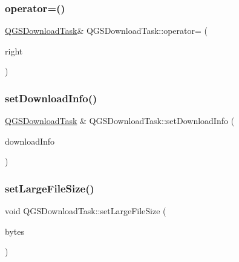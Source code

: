 \mbox{\label{class_q_g_s_download_task_a97a226091a8759b848b3fc7754a52f38}} 
\subsubsection{\texorpdfstring{operator=()}{operator=()}\hspace{0.1cm}{\footnotesize\ttfamily [2/2]}}
{\footnotesize\ttfamily \mbox{\hyperlink{class_q_g_s_download_task}{Q\+G\+S\+Download\+Task}}\& Q\+G\+S\+Download\+Task\+::operator= (\begin{DoxyParamCaption}\item[{\mbox{\hyperlink{class_q_g_s_download_task}{Q\+G\+S\+Download\+Task}} \&\&}]{right }\end{DoxyParamCaption})\hspace{0.3cm}{\ttfamily [delete]}}

\mbox{\label{class_q_g_s_download_task_a0d53b40daf5e4074629d9ce552f4f579}} 
\subsubsection{\texorpdfstring{set\+Download\+Info()}{setDownloadInfo()}}
{\footnotesize\ttfamily \mbox{\hyperlink{class_q_g_s_download_task}{Q\+G\+S\+Download\+Task}} \& Q\+G\+S\+Download\+Task\+::set\+Download\+Info (\begin{DoxyParamCaption}\item[{const \mbox{\hyperlink{class_q_g_s_download_info}{Q\+G\+S\+Download\+Info}} \&}]{download\+Info }\end{DoxyParamCaption})}

\mbox{\label{class_q_g_s_download_task_a45bf37a628a15795549b31a3f3555d57}} 
\subsubsection{\texorpdfstring{set\+Large\+File\+Size()}{setLargeFileSize()}}
{\footnotesize\ttfamily void Q\+G\+S\+Download\+Task\+::set\+Large\+File\+Size (\begin{DoxyParamCaption}\item[{const quint64}]{bytes }\end{DoxyParamCaption})\hspace{0.3cm}{\ttfamily [static]}}

